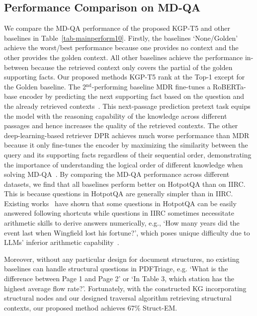 \subsection{Performance Comparison on MD-QA}\label{sec-performance}
We compare the MD-QA performance of the proposed KGP-T5 and other baselines in Table~\ref{tab-mainperform10}. Firstly, the baselines `None/Golden' achieve the worst/best performance because one provides no context and the other provides the golden context. All other baselines achieve the performance in-between because the retrieved context only covers the partial of the golden supporting facts. Our proposed methods KGP-T5 rank at the Top-1 except for the Golden baseline. The 2$^\text{nd}$-performing baseline MDR fine-tunes a RoBERTa-base encoder by predicting the next supporting fact based on the question and the already retrieved contexts~\cite{xiong2020answering}. This next-passage prediction pretext task equips the model with the reasoning capability of the knowledge across different passages and hence increases the quality of the retrieved contexts. The other deep-learning-based retriever DPR achieves much worse performance than MDR because it only fine-tunes the encoder by maximizing the similarity between the query and its supporting facts regardless of their sequential order, demonstrating the importance of understanding the logical order of different knowledge when solving MD-QA~\cite{xiong2020answering}. By comparing the MD-QA performance across different datasets, we find that all baselines perform better on HotpotQA than on IIRC. This is because questions in HotpotQA are generally simpler than in IIRC. Existing works~\cite{jiang2019avoiding} have shown that some questions in HotpotQA can be easily answered following shortcuts while questions in IIRC sometimes necessitate arithmetic skills to derive answers numerically, e.g., `How many years did the event last when Wingfield lost his fortune?', which poses unique difficulty due to LLMs' inferior arithmetic capability~\cite{yuan2023well}.

Moreover, without any particular design for document structures, no existing baselines can handle structural questions in PDFTriage, e.g. `What is the difference between Page 1 and Page 2' or `In Table 3, which station has the highest average flow rate?'. Fortunately, with the constructed KG incorporating structural nodes and our designed traversal algorithm retrieving structural contexts, our proposed method achieves 67\% Struct-EM.




